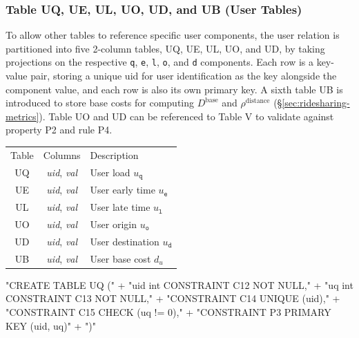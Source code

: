 \documentclass{article}
\def\nwendcode{\endtrivlist \endgroup}      %
\let\nwdocspar=\par
\theoremstyle{definition}                   %
\begin{document}
\subsubsection{Table UQ, UE, UL, UO, UD, and UB (User Tables)}
To allow other tables to reference specific user components, the user relation
is partitioned into five 2-column tables, UQ, UE, UL, UO, and UD, by taking
projections on the respective \texttt{q}, \texttt{e}, \texttt{l}, \texttt{o},
and \texttt{d} components. Each row is a key-value pair, storing a unique
\textsf{uid} for user identification as the key alongside the component value,
and each row is also its own primary key.  A sixth table UB is introduced to
store base costs for computing $D^\textrm{base}$ and $\rho^\textrm{distance}$
(\S\ref{sec:ridesharing-metrics}).  Table UO and UD can be referenced to Table
V to validate against property P2 and rule P4.
\begin{table}[h]
\centering
\small
\begin{tabular}{|c|c|l|}
\hline
\rowcolor{TableTitle}
\multicolumn{3}{|c|}{User Tables}\\
\hline
\rowcolor{TableHeader}
Table & Columns & Description \\
\hline
UQ & \textit{uid}, \textit{val} & User load $u_\texttt{q}$ \\
UE & \textit{uid}, \textit{val} & User early time $u_\texttt{e}$ \\
UL & \textit{uid}, \textit{val} & User late time $u_\texttt{l}$ \\
UO & \textit{uid}, \textit{val} & User origin $u_\texttt{o}$ \\
UD & \textit{uid}, \textit{val} & User destination $u_\texttt{d}$ \\
UB & \textit{uid}, \textit{val} & User base cost $d_u$ \\
\hline
\end{tabular}
\end{table}
\nwenddocs{}\endmoddef{}
"CREATE TABLE UQ ("
  + "uid int  CONSTRAINT C12 NOT NULL,"
  + "uq  int  CONSTRAINT C13 NOT NULL,"
  + "CONSTRAINT C14 UNIQUE (uid),"
  + "CONSTRAINT C15 CHECK (uq != 0),"
  + "CONSTRAINT P3 PRIMARY KEY (uid, uq)"
  + ")"
\nwendcode{}\nwdocspar
\nwenddocs{}\endmoddef{}
\end{document}
